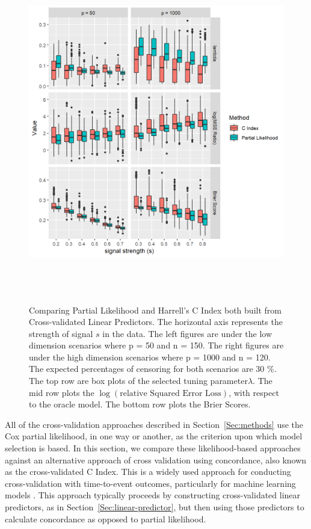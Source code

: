 \begin{figure}[h]
  \centering
  \includegraphics[height= 15cm ]{./manuscript_figure/figure_auc.png}
  \caption{\label{Fig:cvauc}Comparing Partial Likelihood and Harrell's C Index both built from Cross-validated Linear Predictors. The horizontal axis represents the strength of signal $s$ in the data. The left figures are under the low dimension scenarios where p = 50 and n = 150. The right figures are under the high dimension scenarios where p = 1000 and n = 120. The expected percentages of censoring for both scenarios are 30 $\%$. The top row are box plots of the selected tuning parameter$\lambda$. The mid row plots the $\log(\text{relative Squared Error Loss})$, with respect to the oracle model. The bottom row plots the Brier Scores. }
\end{figure}


\par All of the cross-validation approaches described in Section~\ref{Sec:methods} use the Cox partial likelihood, in one way or another, as the criterion upon which model selection is based.  In this section, we compare these likelihood-based approaches against an alternative approach of cross validation using concordance, also known as the cross-validated C Index.  This is a widely used approach for conducting cross-validation with time-to-event outcomes, particularly for machine learning models \citep{Subramanian2011,Simon2011a}. This approach typically proceeds by constructing cross-validated linear predictors, as in Section~\ref{Sec:linear-predictor}, but then using those predictors to calculate concordance as opposed to partial likelihood.

